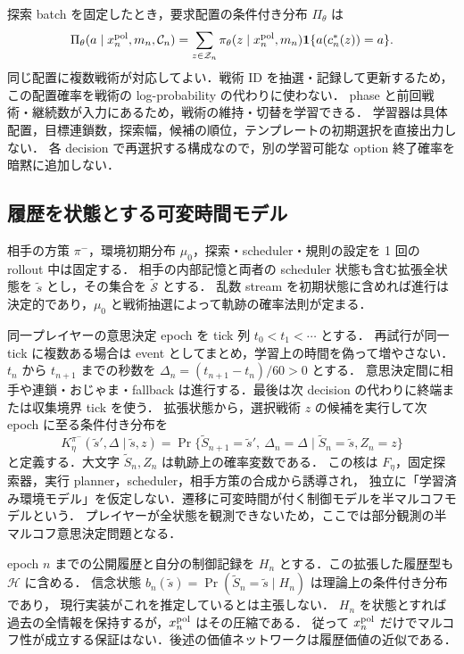 探索 batch を固定したとき，要求配置の条件付き分布 $\Pi_\theta$ は
\begin{equation}\label{eq:composed-policy}
 \Pi_\theta(a\mid x_n^{\rm pol},m_n,\mathcal C_n)
 =\sum_{z\in\mathcal Z_n}\pi_\theta(z\mid x_n^{\rm pol},m_n)
       \mathbf{1}\{a(c_n^*(z))=a\}.
\end{equation}
同じ配置に複数戦術が対応してよい．戦術 ID を抽選・記録して更新するため，
この配置確率を戦術の log-probability の代わりに使わない．
phase と前回戦術・継続数が入力にあるため，戦術の維持・切替を学習できる．
学習器は具体配置，目標連鎖数，探索幅，候補の順位，テンプレートの初期選択を直接出力しない．
各 decision で再選択する構成なので，別の学習可能な option 終了確率を暗黙に追加しない．

\subsection{履歴を状態とする可変時間モデル}\label{sec:semimarkov}
相手の方策 $\pi^-$，環境初期分布 $\mu_0$，探索・scheduler・規則の設定を 1 回の rollout 中は固定する．
相手の内部記憶と両者の scheduler 状態も含む拡張全状態を $\tilde s$ とし，その集合を $\widetilde{\mathcal S}$ とする．
乱数 stream を初期状態に含めれば進行は決定的であり，$\mu_0$ と戦術抽選によって軌跡の確率法則が定まる．

同一プレイヤーの意思決定 epoch を tick 列 $t_0<t_1<\cdots$ とする．
再試行が同一 tick に複数ある場合は event としてまとめ，学習上の時間を偽って増やさない．
$t_n$ から $t_{n+1}$ までの秒数を $\Delta_n=(t_{n+1}-t_n)/60>0$ とする．
意思決定間に相手や連鎖・おじゃま・fallback は進行する．最後は次 decision の代わりに終端または収集境界 tick を使う．
拡張状態から，選択戦術 $z$ の候補を実行して次 epoch に至る条件付き分布を
\begin{equation}\label{eq:kernel}
 K_\eta^{\pi^-}(\tilde s',\Delta\mid\tilde s,z)
 =\Pr\{\tilde S_{n+1}=\tilde s',\ \Delta_n=\Delta\mid\tilde S_n=\tilde s,Z_n=z\}
\end{equation}
と定義する．大文字 $\tilde S_n,Z_n$ は軌跡上の確率変数である．
この核は $F_\eta$，固定探索器，実行 planner，scheduler，相手方策の合成から誘導され，
独立に「学習済み環境モデル」を仮定しない．遷移に可変時間が付く制御モデルを半マルコフモデルという．
プレイヤーが全状態を観測できないため，ここでは部分観測の半マルコフ意思決定問題となる．

epoch $n$ までの公開履歴と自分の制御記録を $H_n$ とする．この拡張した履歴型も $\mathcal H$ に含める．
信念状態 $b_n(\tilde s)=\Pr(\tilde S_n=\tilde s\mid H_n)$ は理論上の条件付き分布であり，
現行実装がこれを推定しているとは主張しない．
$H_n$ を状態とすれば過去の全情報を保持するが，$x_n^{\rm pol}$ はその圧縮である．
従って $x_n^{\rm pol}$ だけでマルコフ性が成立する保証はない．後述の価値ネットワークは履歴価値の近似である．

